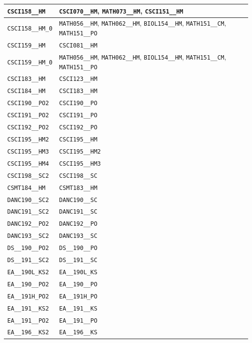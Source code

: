\begin{longtable}{|p{4.4in}|p{4.4in}|}
    \verb|CSCI158__HM| & \verb|CSCI070__HM|, \verb|MATH073__HM|, \verb|CSCI151__HM|\\\hline
    \verb|CSCI158__HM_0| & \verb|MATH056__HM|, \verb|MATH062__HM|, \verb|BIOL154__HM|, \verb|MATH151__CM|, \verb|MATH151__PO|\\\hline
    \verb|CSCI159__HM| & \verb|CSCI081__HM|\\\hline
    \verb|CSCI159__HM_0| & \verb|MATH056__HM|, \verb|MATH062__HM|, \verb|BIOL154__HM|, \verb|MATH151__CM|, \verb|MATH151__PO|\\\hline
    \verb|CSCI183__HM| & \verb|CSCI123__HM|\\\hline
    \verb|CSCI184__HM| & \verb|CSCI183__HM|\\\hline
    \verb|CSCI190__PO2| & \verb|CSCI190__PO|\\\hline
    \verb|CSCI191__PO2| & \verb|CSCI191__PO|\\\hline
    \verb|CSCI192__PO2| & \verb|CSCI192__PO|\\\hline
    \verb|CSCI195__HM2| & \verb|CSCI195__HM|\\\hline
    \verb|CSCI195__HM3| & \verb|CSCI195__HM2|\\\hline
    \verb|CSCI195__HM4| & \verb|CSCI195__HM3|\\\hline
    \verb|CSCI198__SC2| & \verb|CSCI198__SC|\\\hline
    \verb|CSMT184__HM| & \verb|CSMT183__HM|\\\hline
    \verb|DANC190__SC2| & \verb|DANC190__SC|\\\hline
    \verb|DANC191__SC2| & \verb|DANC191__SC|\\\hline
    \verb|DANC192__PO2| & \verb|DANC192__PO|\\\hline
    \verb|DANC193__SC2| & \verb|DANC193__SC|\\\hline
    \verb|DS__190__PO2| & \verb|DS__190__PO|\\\hline
    \verb|DS__191__SC2| & \verb|DS__191__SC|\\\hline
    \verb|EA__190L_KS2| & \verb|EA__190L_KS|\\\hline
    \verb|EA__190__PO2| & \verb|EA__190__PO|\\\hline
    \verb|EA__191H_PO2| & \verb|EA__191H_PO|\\\hline
    \verb|EA__191__KS2| & \verb|EA__191__KS|\\\hline
    \verb|EA__191__PO2| & \verb|EA__191__PO|\\\hline
    \verb|EA__196__KS2| & \verb|EA__196__KS|\\\hline

\end{longtable}
